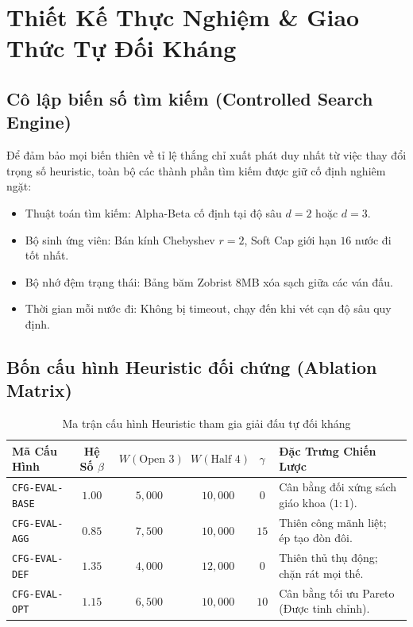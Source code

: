 \documentclass[11pt,a4paper]{article}
\begin{document}
\section{Thiết Kế Thực Nghiệm \& Giao Thức Tự Đối Kháng}

\subsection{Cô lập biến số tìm kiếm (Controlled Search Engine)}
Để đảm bảo mọi biến thiên về tỉ lệ thắng chỉ xuất phát duy nhất từ việc thay đổi trọng số heuristic, toàn bộ các thành phần tìm kiếm được giữ cố định nghiêm ngặt:
\begin{itemize}
    \item Thuật toán tìm kiếm: Alpha-Beta cố định tại độ sâu $d = 2$ hoặc $d = 3$.
    \item Bộ sinh ứng viên: Bán kính Chebyshev $r = 2$, Soft Cap giới hạn $16$ nước đi tốt nhất.
    \item Bộ nhớ đệm trạng thái: Bảng băm Zobrist 8MB xóa sạch giữa các ván đấu.
    \item Thời gian mỗi nước đi: Không bị timeout, chạy đến khi vét cạn độ sâu quy định.
\end{itemize}

\subsection{Bốn cấu hình Heuristic đối chứng (Ablation Matrix)}
\begin{table}[htbp]
\centering
\small
\caption{Ma trận cấu hình Heuristic tham gia giải đấu tự đối kháng}
\label{tab:profiles}
\begin{tabularx}{\textwidth}{l c c c c X}
\toprule
\textbf{Mã Cấu Hình} & \textbf{Hệ Số $\beta$} & \textbf{$W(\text{Open 3})$} & \textbf{$W(\text{Half 4})$} & \textbf{$\gamma$} & \textbf{Đặc Trưng Chiến Lược} \\
\midrule
\texttt{CFG-EVAL-BASE} & $1.00$ & $5{,}000$ & $10{,}000$ & $0$ & Cân bằng đối xứng sách giáo khoa ($1:1$). \\
\texttt{CFG-EVAL-AGG}  & $0.85$ & $7{,}500$ & $10{,}000$ & $15$ & Thiên công mãnh liệt; ép tạo đòn đôi. \\
\texttt{CFG-EVAL-DEF}  & $1.35$ & $4{,}000$ & $12{,}000$ & $0$ & Thiên thủ thụ động; chặn rát mọi thế. \\
\texttt{CFG-EVAL-OPT}  & $1.15$ & $6{,}500$ & $10{,}000$ & $10$ & Cân bằng tối ưu Pareto (Được tinh chỉnh). \\
\bottomrule
\end{tabularx}
\end{table}
\end{document}
